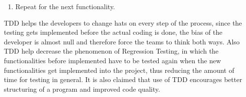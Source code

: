 \begin{parlist}
\begin{enumerate}
			\item Repeat for the next functionality. 
		\end{enumerate}
		TDD helps the developers to change hats on every step of the process, since the testing gets implemented before the actual coding is done, the bias of the developer is almost null and therefore force the teams to think both ways. Also TDD help decrease the phenomenon of Regression Testing, in which the functionalities before implemented have to be tested again when the new functionalities get implemented into the project, thus reducing the amount of time for testing in general. It is also claimed that use of TDD encourages better structuring of a program and improved code quality. \cite{Sommerville:2004aa}
\end{parlist}